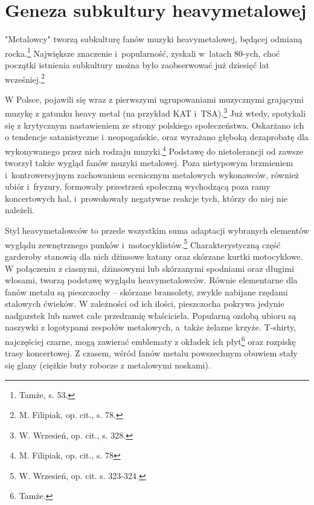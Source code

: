 \documentclass[12pt, a4paper, titlepage]{report}
\begin{document}



\section{Geneza subkultury heavymetalowej}
"Metalowcy" tworzą subkulturę fanów muzyki heavymetalowej, będącej odmianą rocka.\footnote{Tamże, s. 53.}  Największe znaczenie i~popularność, zyskali w~latach 80-ych, choć początki istnienia subkultury można było zaobserwować już dziesięć lat wcześniej.\footnote{M. Filipiak, op. cit., s. 78.} 

W Polsce, pojawili się wraz z pierwszymi ugrupowaniami muzycznymi grającymi muzykę z gatunku heavy metal (na przykład KAT i~TSA).\footnote{W. Wrzesień, op. cit., s. 328.} Już wtedy, spotykali się z krytycznym nastawieniem ze strony polskiego społeczeństwa. Oskarżano ich o tendencje satanistyczne i~neopogańskie, oraz wyrażano głęboką dezaprobatę dla wykonywanego przez nich rodzaju muzyki.\footnote{M. Filipiak, op. cit., s. 78} %
Podstawę do nietolerancji od zawsze tworzył także wygląd fanów muzyki metalowej. Poza nietypowym brzmieniem i~kontrowersyjnym zachowaniem scenicznym metalowych wykonawców, również ubiór i~fryzury, formowały przestrzeń społeczną wychodzącą poza ramy koncertowych hal, i~prowokowały negatywne reakcje tych, którzy do niej nie należeli. 
 
Styl heavymetalowców to przede wszystkim suma adaptacji wybranych elementów wyglądu zewnętrznego punków i~motocyklistów.\footnote{W. Wrzesień, op. cit. s. 323-324.} Charakterystyczną część garderoby stanowią dla nich dżinsowe katany oraz skórzane kurtki motocyklowe. W połączeniu z ciasnymi, dżinsowymi lub skórzanymi spodniami oraz długimi włosami, tworzą podstawę wyglądu heavymetalowców. Równie elementarne dla fanów metalu są pieszczochy -- skórzane bransolety, zwykle nabijane rzędami stalowych ćwieków. W zależności od ich ilości, pieszczocha pokrywa jedynie nadgarstek lub nawet całe przedramię właściciela. Popularną ozdobą ubioru są naszywki z logotypami zespołów metalowych, a~także żelazne krzyże. T-shirty, najczęściej czarne, mogą zawierać emblematy z okładek ich płyt\footnote{Tamże.} oraz rozpiskę trasy koncertowej. %
Z czasem, wśród fanów metalu powszechnym obuwiem stały się glany (ciężkie buty robocze z metalowymi noskami). 
\end{document}
